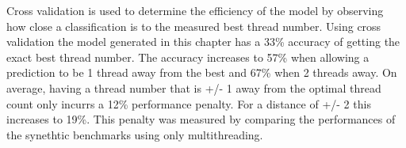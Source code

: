Cross validation is used to determine the efficiency of the model by observing how close a classification is to the measured best thread number.
Using cross validation the model generated in this chapter has a 33\% accuracy of getting the exact best thread number.
The accuracy increases to 57\% when allowing a prediction to be 1 thread away from the best and 67\% when 2 threads away.
On average, having a thread number that is +/- 1 away from the optimal thread count only incurrs a 12\% performance penalty.
For a distance of +/- 2 this increases to 19\%.
This penalty was measured by comparing the performances of the synethtic benchmarks using only multithreading.


